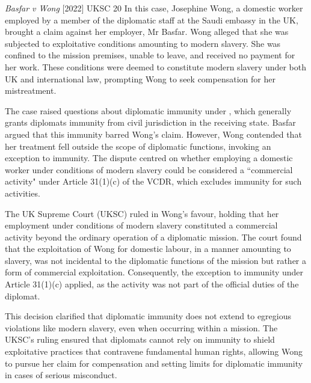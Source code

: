\begin{casedetails}{\textit{Basfar v Wong} [2022] UKSC 20}
    \flushleft
    In this case, Josephine Wong, a domestic worker employed by a member of the diplomatic staff at the Saudi embassy in the UK, brought a claim against her employer, Mr Basfar. Wong alleged that she was subjected to exploitative conditions amounting to modern slavery. She was confined to the mission premises, unable to leave, and received no payment for her work. These conditions were deemed to constitute modern slavery under both UK and international law, prompting Wong to seek compensation for her mistreatment.

    \vspace{\baselineskip}
    
    The case raised questions about diplomatic immunity under , which generally grants diplomats immunity from civil jurisdiction in the receiving state. Basfar argued that this immunity barred Wong's claim. However, Wong contended that her treatment fell outside the scope of diplomatic functions, invoking an exception to immunity. The dispute centred on whether employing a domestic worker under conditions of modern slavery could be considered a ``commercial activity" under Article 31(1)(c) of the VCDR, which excludes immunity for such activities.
    
    \vspace{\baselineskip}
    
    The UK Supreme Court (UKSC) ruled in Wong's favour, holding that her employment under conditions of modern slavery constituted a commercial activity beyond the ordinary operation of a diplomatic mission. The court found that the exploitation of Wong for domestic labour, in a manner amounting to slavery, was not incidental to the diplomatic functions of the mission but rather a form of commercial exploitation. Consequently, the exception to immunity under Article 31(1)(c) applied, as the activity was not part of the official duties of the diplomat.
    
    \vspace{\baselineskip}
    
    This decision clarified that diplomatic immunity does not extend to egregious violations like modern slavery, even when occurring within a mission. The UKSC's ruling ensured that diplomats cannot rely on immunity to shield exploitative practices that contravene fundamental human rights, allowing Wong to pursue her claim for compensation and setting limits for  diplomatic immunity in cases of serious misconduct.
\end{casedetails}

